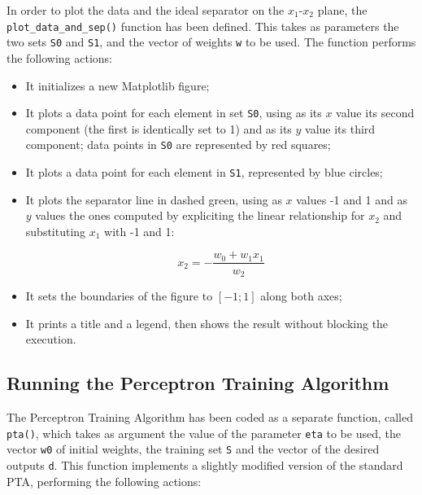 \documentclass[letterpaper,headings=standardclasses]{scrartcl}
\begin{document}
In order to plot the data and the ideal separator on the $x_1$-$x_2$ plane, the \texttt{plot\_data\_and\_sep()} function has been defined. This takes as parameters the two sets \texttt{S0} and \texttt{S1}, and the vector of weights \texttt{w} to be used. The function performs the following actions:

\begin{itemize}

\item It initializes a new Matplotlib figure;

\item It plots a data point for each element in set \texttt{S0}, using as its $x$ value its second component (the first is identically set to 1) and as its $y$ value its third component; data points in \texttt{S0} are represented by red squares;

\item It plots a data point for each element in \texttt{S1}, represented by blue circles;

\item It plots the separator line in dashed green, using as $x$ values -1 and 1 and as $y$ values the ones computed by expliciting the linear relationship for $x_2$ and substituting $x_1$ with -1 and 1:

$$ x_2 = -\frac{w_0 + w_1 x_1}{w_2} $$

\item It sets the boundaries of the figure to $[-1;1]$ along both axes;

\item It prints a title and a legend, then shows the result without blocking the execution.

\end{itemize}

\subsection{Running the Perceptron Training Algorithm}

The Perceptron Training Algorithm has been coded as a separate function, called \texttt{pta()}, which takes as argument the value of the parameter \texttt{eta} to be used, the vector \texttt{w0} of initial weights, the training set \texttt{S} and the vector of the desired outputs \texttt{d}. This function implements a slightly modified version of the standard PTA, performing the following actions:
\end{document}

